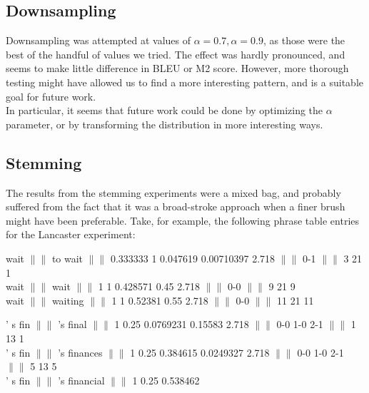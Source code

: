 \documentclass[11pt,letterpaper]{article}
\begin{document}
\subsection{Downsampling}
\indent Downsampling was attempted at values of $\alpha = 0.7, \alpha = 0.9$, as those were the best of the handful of values we tried. 
The effect was hardly pronounced, and seems to make little difference in BLEU or M2 score. However, more thorough testing 
might have allowed us to find a more interesting pattern, and is a suitable goal for future work. \\

In particular, it seems that future work could be  done by optimizing the $\alpha$ parameter, or by transforming the distribution in more interesting ways.
\subsection{Stemming}

The results from the stemming experiments were a mixed bag, and probably suffered from the fact that it was a broad-stroke approach when a finer brush might have been preferable. Take, for example, the following phrase table entries for the Lancaster experiment:

\begin{framed}
wait $\|\|$ to wait $\|\|$ 0.333333 1 0.047619 0.00710397 2.718 $\|\|$ 0-1 $\|\|$ 3 21 1 \\
wait $\|\|$ wait $\|\|$ 1 1 0.428571 0.45 2.718 $\|\|$ 0-0 $\|\|$ 9 21 9 \\
wait $\|\|$ waiting $\|\|$ 1 1 0.52381 0.55 2.718 $\|\|$ 0-0 $\|\|$ 11 21 11
\end{framed}

\begin{framed}
' s fin $\|\|$ 's final $\|\|$ 1 0.25 0.0769231 0.15583 2.718 $\|\|$ 0-0 1-0 2-1 $\|\|$ 1 13 1 \\
' s fin $\|\|$ 's finances $\|\|$ 1 0.25 0.384615 0.0249327 2.718 $\|\|$ 0-0 1-0 2-1 $\|\|$ 5 13 5 \\
' s fin $\|\|$ 's financial $\|\|$ 1 0.25 0.538462
\end{framed}
\end{document}
